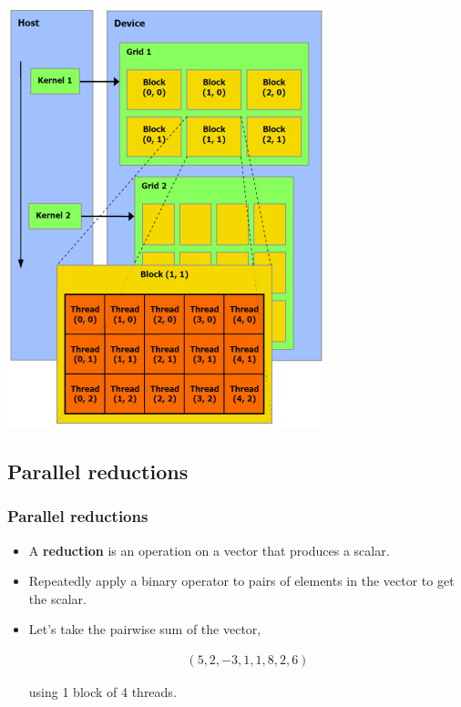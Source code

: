 \documentclass[handout]{beamer}
\numberwithin{equation}{section}
\begin{document}
\begin{frame}
\begin{center}
\includegraphics[scale=.7]{fig/gridBlocksThreads.jpg}
\end{center}
\end{frame}


\subsection{Parallel reductions}

\begin{frame}
\frametitle{Parallel reductions}

\begin{itemize}
\item A {\bf reduction} is an operation on a vector that produces a scalar. 
\pause \item Repeatedly apply a binary operator to pairs of elements in the vector to get the scalar.
\pause \item Let's take the pairwise sum of the vector,

\begin{align*}
(5, 2, -3, 1, 1, 8, 2, 6)
\end{align*}

using 1 block of 4 threads.
\end{itemize}
\end{frame}
\end{document}
